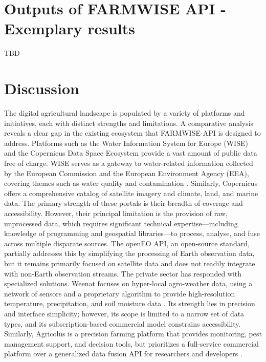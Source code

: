 \documentclass[preprint,12pt,authoryear]{elsarticle}
\begin{document}
\section{Outputs of FARMWISE API - Exemplary results}
\label{Results}

TBD



\section{Discussion}
\label{Discussion}
The digital agricultural landscape is populated by a variety of platforms and initiatives, each with distinct strengths and limitations. A comparative analysis reveals a clear gap in the existing ecosystem that FARMWISE-API is designed to address.
Platforms such as the Water Information System for Europe (WISE) and the Copernicus Data Space Ecosystem \citep{Kovcs2026,WISE2026} provide a vast amount of public data free of charge. WISE serves as a gateway to water-related information collected by the European Commission and the European Environment Agency (EEA), covering themes such as water quality and contamination \citep{EEA2025,Commission2022,commission2025}. Similarly, Copernicus offers a comprehensive catalog of satellite imagery and climate, land, and marine data. The primary strength of these portals is their breadth of coverage and accessibility. However, their principal limitation is the provision of raw, unprocessed data, which requires significant technical expertise—including knowledge of programming and geospatial libraries—to process, analyse, and fuse across multiple disparate sources. The openEO API\citep{Schramm2021}, an open-source standard, partially addresses this by simplifying the processing of Earth observation data, but it remains primarily focused on satellite data and does not readily integrate with non-Earth observation streams.
The private sector has responded with specialized solutions. Weenat focuses on hyper-local agro-weather data, using a network of sensors and a proprietary algorithm to provide high-resolution temperature, precipitation, and soil moisture data \citep{Weenat2026}. Its strength lies in precision and interface simplicity; however, its scope is limited to a narrow set of data types, and its subscription-based commercial model constrains accessibility. Similarly, Agricolus is a precision farming platform that provides monitoring, pest management support, and decision tools, but prioritizes a full-service commercial platform over a generalized data fusion API for researchers and developers \citep{Agricolus2026}.
\end{document}
